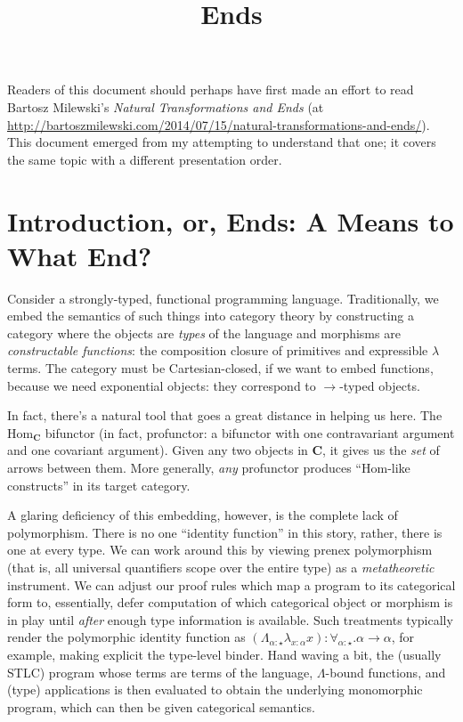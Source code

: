 \documentclass[letterpaper]{article}
\title{Ends}
\begin{document}
Readers of this document should perhaps have first made an effort to read
Bartosz Milewski's \textit{Natural Transformations and Ends} (at
\url{http://bartoszmilewski.com/2014/07/15/natural-transformations-and-ends/}).
This document emerged from my attempting to understand that one; it covers
the same topic with a different presentation order.

\section{Introduction, or, Ends: A Means to What End?}

Consider a strongly-typed, functional programming language.  Traditionally,
we embed the semantics of such things into category theory by constructing a
category where the objects are {\em types} of the language and morphisms are
{\em constructable functions}: the composition closure of primitives and
expressible $\lambda$ terms.  The category must be Cartesian-closed, if we
want to embed functions, because we need exponential objects: they
correspond to $\to$-typed objects.

In fact, there's a natural tool that goes a great distance in helping us
here.  The $\text{Hom}_{\mathbf{C}}$ bifunctor (in fact, profunctor: a
bifunctor with one contravariant argument and one covariant argument).
Given any two objects in $\mathbf{C}$, it gives us the {\em set} of arrows
between them.  More generally, {\em any} profunctor produces
``$\text{Hom}$-like constructs'' in its target category.

A glaring deficiency of this embedding, however, is the complete lack of
polymorphism.  There is no one ``identity function'' in this story, rather,
there is one at every type.  We can work around this by viewing prenex
polymorphism (that is, all universal quantifiers scope over the entire type)
as a {\em metatheoretic} instrument.  We can adjust our proof rules which
map a program to its categorical form to, essentially, defer computation of
which categorical object or morphism is in play until {\em after} enough
type information is available.  Such treatments typically render the
polymorphic identity function as $(\Lambda_{\alpha : \star} \lambda_{x :
\alpha} x) : \forall_{\alpha : \star} . \alpha \to \alpha$, for example,
making explicit the type-level binder.  Hand waving a bit, the (usually
STLC) program whose terms are terms of the language, $\Lambda$-bound
functions, and (type) applications is then evaluated to obtain the
underlying monomorphic program, which can then be given categorical
semantics.
\end{document}
